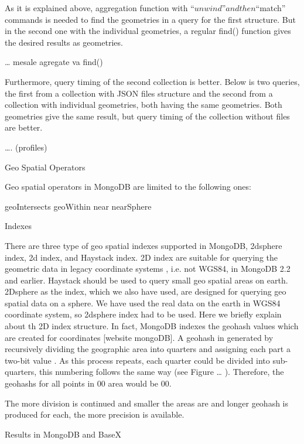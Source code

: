 As it is explained above, aggregation function with “$unwind” and then “$match” commands is needed to find the geometries in a query for the first structure. But in the second one with the individual geometries, a regular find() function gives the desired results as geometries.

… mesale agregate va find()

Furthermore, query timing of the second collection is better. Below is two queries, the first from a collection with JSON files structure and the second from a collection with individual geometries, both having the same geometries. Both geometries give the same result, but query timing of the collection without files are better. 

…. (profiles)


Geo Spatial Operators

Geo spatial operators in MongoDB are limited to the following ones:

geoIntersects
geoWithin
near
nearSphere


Indexes 

There are three type of geo spatial indexes supported in MongoDB, 2dsphere index, 2d index, and Haystack index. 2D index are suitable for querying the geometric data in legacy coordinate systems , i.e. not WGS84, in MongoDB 2.2 and earlier. Haystack should be used to query small geo spatial areas on earth. 2Dsphere as the index, which we also have used, are designed for querying geo spatial data on a sphere. We have used the real data on the earth in WGS84 coordinate system, so 2dsphere index had to be used. Here we briefly explain about th 2D index structure. 
In fact, MongoDB indexes the geohash values which are created for coordinates [website mongoDB]. A geohash in generated by recursively dividing the geographic area into quarters and assigning each part a two-bit value . As this process repeats, each quarter could be divided into sub-quarters, this numbering follows the same way (see Figure … ). Therefore, the geohashs for all points in 00 area would be 00.


The more division is continued and smaller the areas are and longer geohash is produced for each, the more precision is available.

Results in MongoDB and BaseX

